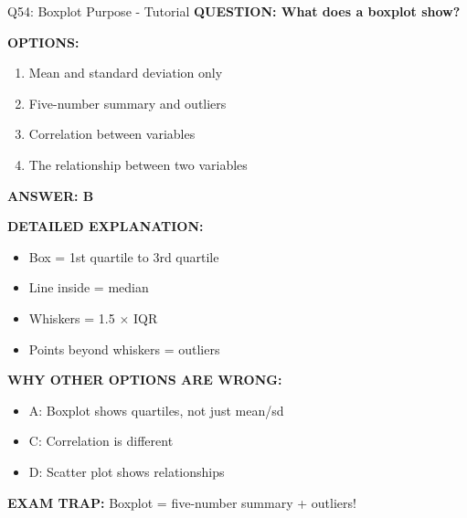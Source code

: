 \documentclass[8pt]{beamer}
\begin{document}
	\begin{frame}{Q54: Boxplot Purpose - Tutorial}
		\fontsize{6.5}{7.5}\selectfont
		\textbf{QUESTION: What does a boxplot show?}
		
		\vspace{0.1cm}
		\textbf{OPTIONS:}
		\begin{enumerate}
			\item Mean and standard deviation only
			\item Five-number summary and outliers
			\item Correlation between variables
			\item The relationship between two variables
		\end{enumerate}
		
		\vspace{0.1cm}
		\textcolor{myblue}{\textbf{ANSWER: B}}
		
		\vspace{0.1cm}
		\textbf{DETAILED EXPLANATION:}
		\begin{itemize}
			\item Box = 1st quartile to 3rd quartile
			\item Line inside = median
			\item Whiskers = 1.5 $\times$ IQR
			\item Points beyond whiskers = outliers
		\end{itemize}
		
		\vspace{0.1cm}
		\textcolor{myred}{\textbf{WHY OTHER OPTIONS ARE WRONG:}}
		\begin{itemize}
			\item \textcolor{myred}{A:} Boxplot shows quartiles, not just mean/sd
			\item \textcolor{myred}{C:} Correlation is different
			\item \textcolor{myred}{D:} Scatter plot shows relationships
		\end{itemize}
		
		\textcolor{myred}{\textbf{EXAM TRAP:}} Boxplot = \textcolor{myblue}{five-number summary + outliers}!
	\end{frame}
	
\end{document}

